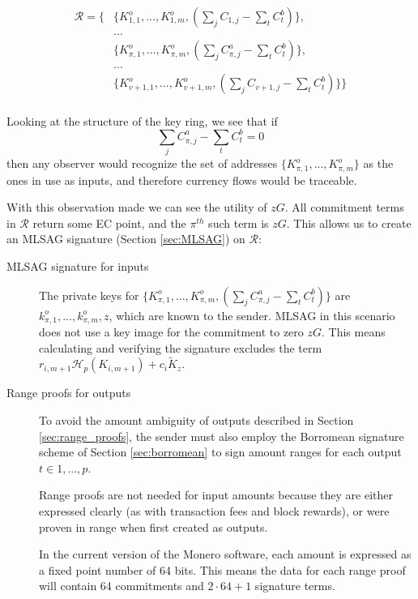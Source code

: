 \begin{align*}
  \mathcal{R} = \{ &\{K_{1,1}^o,...,K_{1,m}^o, (\sum\limits_j C_{1, j} - \sum\limits_t C^b_{t})\}, \\
  &... \\
  &\{K_{\pi,1}^o,...,K_{\pi,m}^o, (\sum\limits_j C^a_{\pi, j} - \sum\limits_t C^b_{t})\}, \\
  &... \\
  &\{K_{v+1,1}^o,...,K_{v+1,m}^o, (\sum\limits_j C_{v+1, j} - \sum\limits_t C^b_{t})\}\}
\end{align*}
\\

Looking at the structure of the key ring, we see that if  \[\sum\limits_j C^a_{\pi, j} -\sum\limits_t C^b_{t} = 0\] then any observer would recognize the set of addresses
$\{K_{\pi,1}^o,...,K_{\pi,m}^o\}$
as the ones in use as inputs, and therefore currency flows would be traceable.

With this observation made we can see the utility of $z G$. All commitment terms in $\mathcal{R}$ return some EC point, and the $\pi^{th}$ such term is $z G$. This allows us to create an MLSAG signature (Section \ref{sec:MLSAG}) on $\mathcal{R}$:


\begin{description}
	
	\item [MLSAG signature for inputs]
	The private keys for 
	\(\{K_{\pi,1}^o,...,K_{\pi,m}^o, (\sum\limits_j C_{\pi, j}^a - \sum\limits_t C^b_{t})\}\)
	are \(k_{\pi,1}^o,...,k_{\pi,m}^o, z\), which are known to the sender. 
	MLSAG in this scenario does not use a key image for the commitment to zero $z G$. This means calculating and verifying the signature excludes the term $r_{i,m+1} \mathcal{H}_p(K_{i,m+1}) + c_i \tilde{K}_z$.
	
	\item[Range proofs for outputs]
	To avoid the amount ambiguity of outputs described in Section  \ref{sec:range_proofs}, the sender must also employ the Borromean signature scheme of Section \ref{sec:borromean} to sign amount ranges for each output $t \in {1, ..., p}$.
	
	Range proofs are not needed for input amounts because they are either expressed clearly (as with transaction fees and block rewards), or were proven in range when first created as outputs.
	
	In the current version of the Monero software, each amount is expressed as a fixed point number of 64 bits. This means the data for each range proof will contain 64 commitments and $2 \cdot 64 + 1$ signature terms.
	
\end{description}



